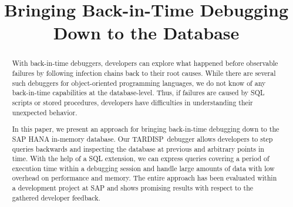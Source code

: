 \documentclass[english,conference,final]{IEEEtran}
\newcommand{\tool}{TAR\-DISP}
\begin{document}
\title{Bringing Back-in-Time Debugging\\ Down to the Database}

\author{
\and
{}
\and
{}
}




\maketitle
\begin{abstract}
With back-in-time debuggers, developers can explore what happened before observable failures by following infection chains back to their root causes.
While there are several such debuggers for object-oriented programming languages, we do not know of any back-in-time capabilities at the database-level.
Thus, if failures are caused by SQL scripts or stored procedures, developers have difficulties in understanding their unexpected behavior.

In this paper, we present an approach for bringing back-in-time debugging down to the SAP HANA in-memory database.
Our \tool\ debugger allows developers to step queries backwards and inspecting the database at previous and arbitrary points in time.
With the help of a SQL extension, we can express queries covering a period of execution time within a debugging session and handle large amounts of data with low overhead on performance and memory.
The entire approach has been evaluated within a development project at SAP and shows promising results with respect to the gathered developer feedback.
\end{abstract}
\end{document}
